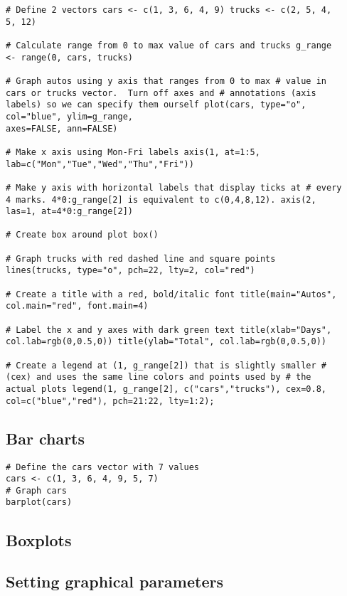 \begin{framed}
\begin{verbatim}
# Define 2 vectors cars <- c(1, 3, 6, 4, 9) trucks <- c(2, 5, 4,
5, 12)

# Calculate range from 0 to max value of cars and trucks g_range
<- range(0, cars, trucks)

# Graph autos using y axis that ranges from 0 to max # value in
cars or trucks vector.  Turn off axes and # annotations (axis
labels) so we can specify them ourself plot(cars, type="o",
col="blue", ylim=g_range,
axes=FALSE, ann=FALSE)

# Make x axis using Mon-Fri labels axis(1, at=1:5,
lab=c("Mon","Tue","Wed","Thu","Fri"))

# Make y axis with horizontal labels that display ticks at # every
4 marks. 4*0:g_range[2] is equivalent to c(0,4,8,12). axis(2,
las=1, at=4*0:g_range[2])

# Create box around plot box()

# Graph trucks with red dashed line and square points
lines(trucks, type="o", pch=22, lty=2, col="red")

# Create a title with a red, bold/italic font title(main="Autos",
col.main="red", font.main=4)

# Label the x and y axes with dark green text title(xlab="Days",
col.lab=rgb(0,0.5,0)) title(ylab="Total", col.lab=rgb(0,0.5,0))

# Create a legend at (1, g_range[2]) that is slightly smaller #
(cex) and uses the same line colors and points used by # the
actual plots legend(1, g_range[2], c("cars","trucks"), cex=0.8,
col=c("blue","red"), pch=21:22, lty=1:2);

\end{verbatim}
\end{framed}
\subsection{Bar charts}
\begin{framed}
\begin{verbatim}
# Define the cars vector with 7 values
cars <- c(1, 3, 6, 4, 9, 5, 7)
# Graph cars
barplot(cars)
\end{verbatim}
\end{framed}
\subsection{Boxplots}
\subsection{Setting graphical parameters}
